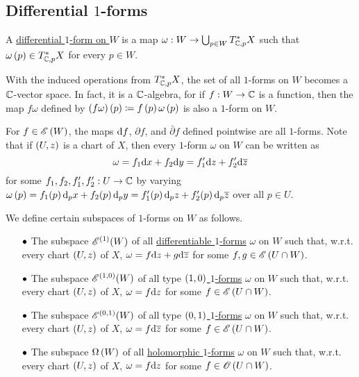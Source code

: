 \documentclass[../Moduli_Spaces_of_Riemann_Surfaces.tex]{subfiles}
\begin{document}
    \subsection{Differential $1$-forms}
    \begin{definition}
        A \ul{differential $1$-form on $W$} is a map $\omega:W\to\bigcup_{p\in W}T_{\mathbb{C},p}^\ast X$ such that $\omega\left(p\right)\in T_{\mathbb{C},p}^\ast X$ for every $p\in W$.
    \end{definition}
    \begin{remark}
        With the induced operations from $T_{\mathbb{C},p}^\ast X$, the set of all $1$-forms on $W$ becomes a $\mathbb{C}$-vector space. In fact, it is a $\mathbb{C}$-algebra, for if $f:W\to\mathbb{C}$ is a function, then the map $f\omega$ defined by $\left(f\omega\right)\left(p\right)\coloneqq f\left(p\right)\omega\left(p\right)$ is also a $1$-form on $W$.\exqed
    \end{remark}
    \begin{example}
        For $f\in\mathscr{E}\left(W\right)$, the maps $\mathrm{d} f$, $\partial f$, and $\bar{\partial}f$ defined pointwise are all $1$-forms. Note that if $\left(U,z\right)$ is a chart of $X$, then every $1$-form $\omega$ on $W$ can be written as
        \begin{equation*}
            \omega=f_1\mathrm{d} x+f_2\mathrm{d} y=f_1'\mathrm{d} z+f_2'\mathrm{d}\overline{z}
        \end{equation*}
        for some $f_1,f_2,f_1',f_2':U\to\mathbb{C}$ by varying $\omega\left(p\right)=f_1\!\left(p\right)\mathrm{d}_px+f_2\!\left(p\right)\mathrm{d}_py=f_1'\!\left(p\right)\mathrm{d}_pz+f_2'\!\left(p\right)\mathrm{d}_p\overline{z}$ over all $p\in U$.\exqed
    \end{example}
    \begin{definition}
        We define certain subspaces of $1$-forms on $W$ as follows.
        \begin{itemize}
            \item[$\bullet$] The subspace $\mathscr{E}^{\left(1\right)}\!\left(W\right)$ of all \ul{differentiable $1$-forms} $\omega$ on $W$ such that, w.r.t. every chart $\left(U,z\right)$ of $X$, $\omega=f\mathrm{d} z+g\mathrm{d}\overline{z}$ for some $f,g\in\mathscr{E}\left(U\cap W\right)$.
                \vspace{-0.05in}
            \item[$\bullet$] The subspace $\mathscr{E}^{\left(1,0\right)}\!\left(W\right)$ of all type \ul{$\left(1,0\right)$ $1$-forms} $\omega$ on $W$ such that, w.r.t. every chart $\left(U,z\right)$ of $X$, $\omega=f\mathrm{d} z$ for some $f\in\mathscr{E}\left(U\cap W\right)$.
                \vspace{-0.05in}
            \item[$\bullet$] The subspace $\mathscr{E}^{\left(0,1\right)}\!\left(W\right)$ of all type \ul{$\left(0,1\right)$ $1$-forms} $\omega$ on $W$ such that, w.r.t. every chart $\left(U,z\right)$ of $X$, $\omega=f\mathrm{d}\overline{z}$ for some $f\in\mathscr{E}\left(U\cap W\right)$.
                \vspace{-0.05in}
            \item[$\bullet$] The subspace $\Omega\left(W\right)$ of all \ul{holomorphic $1$-forms} $\omega$ on $W$ such that, w.r.t. every chart $\left(U,z\right)$ of $X$, $\omega=f\mathrm{d} z$ for some $f\in\mathscr{O}\left(U\cap W\right)$.
        \end{itemize}
    \end{definition}
\end{document}

